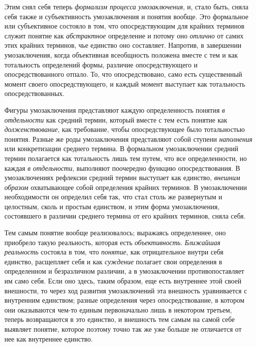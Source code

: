 \documentclass[twoside]{article}
\begin{document}
{{{{{{Этим снял себя теперь
{\em формализм процесса умозаключения},
и, стало быть, сняла себя также и субъективность
умозаключения и понятия вообще. Это формальное или субъективное состояло в
том, что опосредствующим для крайних терминов служит понятие как
{\em абстрактное}
определение и потому оно
{\em отлично} от самих
этих крайних терминов, чье единство оно составляет. Напротив, в завершении
умозаключения, когда объективная всеобщность положена вместе с тем и как
тотальность определений формы, различие опосредствующего и
опосредствованного отпало. То, что опосредствовано, само есть существенный
момент своего опосредствующего, и каждый момент выступает как тотальность
опосредствованных.

Фигуры умозаключения представляют каждую определенность
понятия {\em в отдельности}
как средний термин, который вместе с тем есть понятие как
{\em долженствование},
как требование, чтобы опосредствующее было тотальностью
понятия. Разные же роды умозаключения представляют собой ступени
{\em наполнения} или
конкретизации среднего термина. В формальном умозаключении средний термин
полагается как тотальность лишь тем путем, что все определенности, но
каждая {\em в отдельности},
выполняют поочередно функцию опосредствования. В
умозаключениях рефлексии средний термин выступает как единство,
{\em внешним образом} охватывающее собой определения крайних терминов. В
умозаключении необходимости он определил себя так, что стал столь же
развернутым и целостным, сколь и простым единством, и этим форма
умозаключения, состоявшего в различии среднего термина от его крайних
терминов, сняла себя.

Тем самым понятие вообще реализовалось; выражаясь
определеннее, оно приобрело такую реальность, которая есть
{\em объективность}.
{\em Ближайшая реальность}
состояла в том, что
{\em понятие}, как
отрицательное внутри себя единство, расщепляет себя и как
{\em суждение} полагает
свои определения в определенном и безразличном различии, а в умозаключении
противопоставляет им само себя. Если оно здесь, таким образом, еще есть
внутреннее этой своей внешности, то через ход развития умозаключений эта
внешность уравнивается с внутренним единством; разные определения через
опосредствование, в котором они оказываются чем-то единым первоначально
лишь в некотором третьем, теперь возвращаются в это единство, и внешность
тем самым на самой себе выявляет понятие, которое поэтому точно так же уже
больше не отличается от нее как внутреннее единство.

}}}}}}
\end{document}
